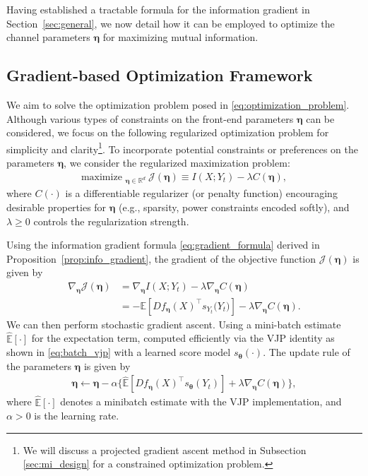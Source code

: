 \documentclass[conference]{IEEEtran}
\newcommand{\R}{\mathbb{R}}
\newcommand{\E}{\mathbb{E}}
\newcommand{\Yt}{Y_t}
\begin{document}
Having established a tractable formula for the information gradient 
in Section~\ref{sec:general}, 
we now detail how it can be employed to optimize the channel parameters $\bm \eta$ 
for maximizing mutual information.

\subsection{Gradient-based Optimization Framework} 
\label{subsec:gradient_ascent}

We aim to solve the optimization problem posed in \eqref{eq:optimization_problem}. 
Although various types of constraints on the front-end parameters $\bm\eta$ can be considered, 
we focus on the following regularized optimization problem for simplicity and clarity\footnote{We will discuss a projected gradient ascent method in Subsection \ref{sec:mi_design} for a constrained optimization problem.}.
To incorporate potential constraints or preferences on the parameters $\bm \eta$, 
we consider the regularized maximization problem: 
\begin{align} 
\text{maximize }_{\bm\eta \in \R^d}\ \mathcal{J}(\bm\eta) \equiv I(X;Y_t) - \lambda C(\bm\eta), 
\label{eq:max_objective} 
\end{align} 
where $C(\cdot)$ is a differentiable regularizer (or penalty function) 
encouraging desirable properties for $\bm \eta$ 
(e.g., sparsity, power constraints encoded softly), 
and $\lambda \geq 0$ controls the regularization strength. 

Using the information gradient formula \eqref{eq:gradient_formula} 
derived in Proposition~\ref{prop:info_gradient}, 
the gradient of the objective function $\mathcal{J}(\bm \eta)$ is given by
\begin{align} 
\nabla_{\bm\eta} \mathcal{J}(\bm\eta) &= \nabla_{\bm\eta} I(X;Y_t) 
- \lambda \nabla_{\bm\eta} C(\bm\eta) \\
&= -\E\!\left[ D f_{\bm\eta}(X)^{\!\top} s_{Y_t}\!\big(\Yt\big)\right]
- \lambda \nabla_{\bm\eta} C(\bm\eta).
\label{eq:objective_gradient} 
\end{align} 
We can then perform stochastic gradient ascent. 
Using a mini-batch estimate $\widehat{\E}[\cdot]$ for the expectation term, 
computed efficiently via the VJP identity 
as shown in \eqref{eq:batch_vjp} with a learned score model $s_{\bm \theta}(\cdot)$.
The update rule of the parameters $\bm \eta$ is given by
\begin{align}
    \label{eq:param_update}
    \bm\eta \leftarrow \bm\eta - \alpha
    \Big\{ \widehat{\E}\!\left[ D f_{\bm\eta}(X)^{\!\top} s_{\bm \theta}(\Yt) \right]
           + \lambda \nabla_{\bm\eta} C(\bm\eta)\Big\},
\end{align}
where $\widehat{\E}[\cdot]$ denotes a minibatch estimate with the VJP implementation,
and $\alpha>0$ is the learning rate.
\end{document}
